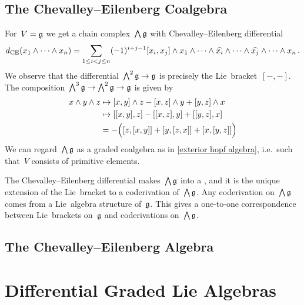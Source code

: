 \documentclass[a4paper,10pt,headings=standardclasses]{scrartcl}
\begin{document}
\subsection{The Chevalley--Eilenberg Coalgebra}

For~$V = \mathfrak{g}$ we get a chain complex~$\bigwedge \mathfrak{g}$ with Chevalley--Eilenberg differential
\[
  d_{\text{CE}}(x_1 \wedge \dotsb \wedge x_n)
  =
  \sum_{1 \leq i < j \leq n}
  (-1)^{i+j-1}
  [x_i, x_j]
  \wedge x_1
  \wedge \dotsb
  \wedge \widehat{x_i}
  \wedge \dotsb
  \wedge \widehat{x_j}
  \wedge \dotsb
  \wedge x_n \,.
\]
We observe that the differential~$\bigwedge^2 \mathfrak{g} \to \mathfrak{g}$ is precisely the Lie~bracket~$[-,-]$.
The composition~$\bigwedge^3 \mathfrak{g} \to \bigwedge^2 \mathfrak{g} \to \mathfrak{g}$ is given by
\begin{align*}
  x \wedge y \wedge z
  &\mapsto
  [x,y] \wedge z - [x,z] \wedge y + [y,z] \wedge x
  \\
  &\mapsto
  [[x,y], z] - [[x,z], y] + [[y,z], x]
  \\
  &=
  -\Bigl( [z,[x,y]] + [y,[z,x]] + [x,[y,z]] \Bigr)
\end{align*}
We can regard~$\bigwedge \mathfrak{g}$ as a graded coalgebra as in \cref{exterior hopf algebra}, i.e.\ such that~$V$ consists of primitive elements.

\begin{proposition}
  The Chevalley--Eilenberg differential makes~$\bigwedge \mathfrak{g}$ into a {\dgc}, and it is the unique extension of the Lie~bracket to a coderivation of~$\bigwedge \mathfrak{g}$.
  Any coderivation on~$\bigwedge \mathfrak{g}$ comes from a Lie~algebra structure of~$\mathfrak{g}$.
  This gives a one-to-one correspondence between Lie~brackets on~$\mathfrak{g}$ and coderivations on~$\bigwedge \mathfrak{g}$.
\end{proposition}





\subsection{The Chevalley--Eilenberg Algebra}%







\section{Differential Graded Lie Algebras}
\end{document}
